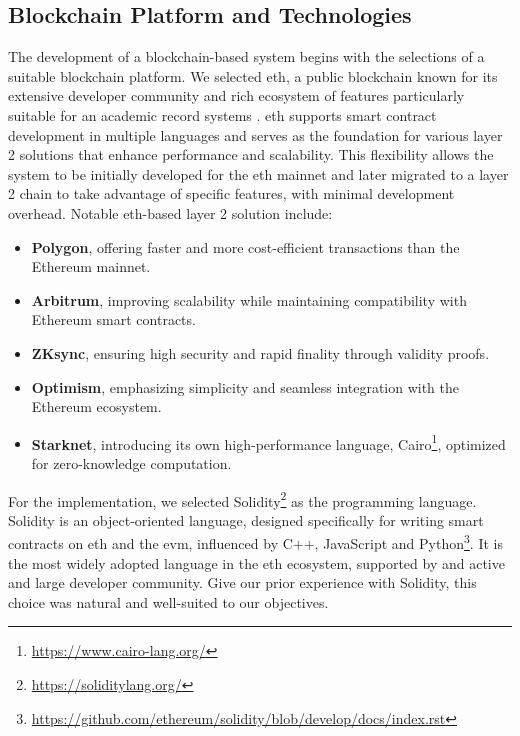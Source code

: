 \subsection{Blockchain Platform and Technologies}
The development of a blockchain-based system begins with the selections of a suitable blockchain platform. We selected \acrlong{eth}, a public blockchain known for its extensive developer community and rich ecosystem of features particularly suitable for an academic record systems \cite{mustafa2024publiceduchain}\cite{yassynzhanbolatzhan2021verificationuniversitystudent}. \acrlong{eth} supports smart contract development in multiple languages and serves as the foundation for various layer 2 solutions that enhance performance and scalability. This flexibility allows the system to be initially developed for the \acrlong{eth} mainnet and later migrated to a layer 2 chain to take advantage of specific features, with minimal development overhead. Notable \acrlong{eth}-based layer 2 solution include:

\begin{itemize}
    \item \textbf{Polygon}, offering faster and more cost-efficient transactions than the Ethereum mainnet.
    \item \textbf{Arbitrum}, improving scalability while maintaining compatibility with Ethereum smart contracts.
    \item \textbf{ZKsync}, ensuring high security and rapid finality through validity proofs.
    \item \textbf{Optimism}, emphasizing simplicity and seamless integration with the Ethereum ecosystem.
    \item \textbf{Starknet}, introducing its own high-performance language, Cairo\footnote{\url{https://www.cairo-lang.org/}}, optimized for zero-knowledge computation.
\end{itemize}

For the implementation, we selected Solidity\footnote{\url{https://soliditylang.org/}} as the programming language. Solidity is an object-oriented language, designed specifically for writing smart contracts on \acrlong{eth} and the \acrshort{evm}, influenced by C++, JavaScript and Python\footnote{\url{https://github.com/ethereum/solidity/blob/develop/docs/index.rst}}. It is the most widely adopted language in the \acrlong{eth} ecosystem, supported by and active and large developer community. Give our prior experience with Solidity, this choice was natural and well-suited to our objectives.

